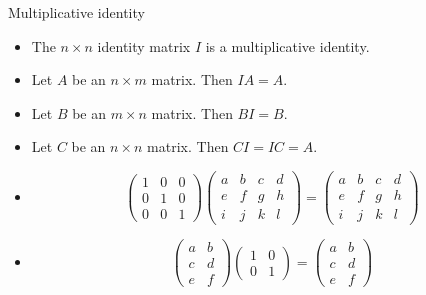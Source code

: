\documentclass{beamer}
\begin{document}

\beamerdefaultoverlayspecification{<+->}

\begin{frame}{Multiplicative identity}
\begin{itemize}
\item The $n\times n$ identity matrix $I$ is a multiplicative identity.
\item Let $A$ be an $n\times m$ matrix. Then $I A = A$.
\item Let $B$ be an $m \times n$ matrix. Then $B I = B$.
\item Let $C$ be an $n\times n$ matrix. Then $C I = I C = A$.
\item
$$
\begin{pmatrix}
1 & 0 & 0 \\
0 & 1 & 0 \\
0 & 0 & 1
\end{pmatrix}
\begin{pmatrix}
a & b & c & d \\
e & f & g & h \\
i & j & k & l
\end{pmatrix}
=
\begin{pmatrix}
a & b & c & d \\
e & f & g & h \\
i & j & k & l
\end{pmatrix}
$$
\item
$$
\begin{pmatrix}
a & b \\
c & d \\
e & f
\end{pmatrix}
\begin{pmatrix}
1 & 0\\
0 & 1
\end{pmatrix}
=
\begin{pmatrix}
a & b  \\
c & d  \\
e & f
\end{pmatrix}
$$
\end{itemize}
\end{frame}

\end{document}

